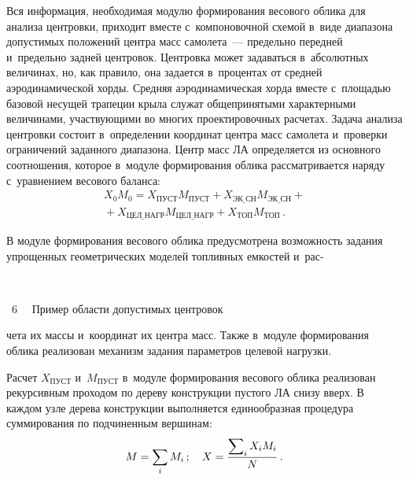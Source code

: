 \begin{multicols}{2}
Вся информация, 
необходимая модулю формирования весового облика для анализа центровки, 
приходит вмес\-те с~компоновочной схемой в~виде диапазона допустимых 
положений цент\-ра масс самолета~--- предельно передней и~предельно задней 
центровок. Центровка может задаваться в~абсолютных величинах, но, как 
правило, она задается в~процентах от средней аэродинамической хорды. 
Средняя аэродинамическая хорда вместе с~пло\-щадью базовой несущей 
трапеции крыла служат общепринятыми характерными величинами, 
участвующими во многих проектировочных расчетах. 
%
Задача анализа 
центровки со\-сто\-ит в~определении координат цент\-ра масс самолета и~проверки 
ограничений заданного диапазона. Центр масс ЛА определяется из основного 
соотношения, которое в~модуле формирования облика рас\-смат\-ри\-ва\-ет\-ся наряду 
с~уравнением весового баланса:
  \begin{multline*}
  X_0 M_0 = X_{\mathrm{ПУСТ}} M_{\mathrm{ПУСТ}} + X_{\mathrm{ЭК\_СН}} 
M_{\mathrm{ЭК\_СН}} + {}\\
{}+X_{\mathrm{ЦЕЛ\_НАГР}} M_{\mathrm{ЦЕЛ\_НАГР}} + X_{\mathrm{ТОП}} 
M_{\mathrm{ТОП}}\,.
   \end{multline*}
  
  В модуле формирования весового облика предусмотрена возможность 
задания упрощенных гео\-мет\-ри\-че\-ских моделей топливных емкостей и~рас-\linebreak\vspace*{-12pt}

{ \begin{center}  %
 \vspace*{9pt}
    \mbox{%
\epsfxsize=79mm
}

\vspace*{6pt}

\noindent
{{\figurename~6}\ \ \small{
Пример области допустимых центровок
}}
\end{center}
}



\noindent
чета 
их массы и~координат их центра масс. Также в~модуле формирования облика 
реализован механизм задания параметров целевой нагрузки. 



  Расчет $X_{\mathrm{ПУСТ}}$ и~$M_{\mathrm{ПУСТ}}$ в~модуле формирования 
весового облика реализован рекурсивным проходом по дереву конструкции 
пустого ЛА снизу вверх. В каждом узле дерева конструкции выполняется 
единообразная процедура суммирования по подчиненным вершинам:
  $$
  M=\sum\limits_i M_i\,; \quad X=\displaystyle\frac{\displaystyle \sum\nolimits_i  X_i M_i\mathstrut}{\displaystyle N\mathstrut}\,.
  $$
  


\end{multicols}
